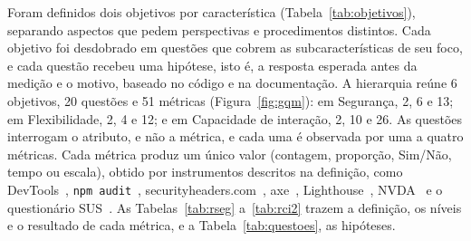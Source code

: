\documentclass[conference]{IEEEtran}
\begin{document}
Foram definidos dois objetivos por característica
(Tabela~\ref{tab:objetivos}), separando aspectos que pedem perspectivas e
procedimentos distintos. Cada objetivo foi desdobrado em questões que cobrem
as subcaracterísticas de seu foco, e cada questão recebeu uma hipótese, isto
é, a resposta esperada antes da medição e o motivo, baseado no código e na
documentação. A hierarquia reúne 6 objetivos, 20 questões e 51 métricas
(Figura~\ref{fig:gqm}): em Segurança, 2, 6 e 13; em Flexibilidade, 2, 4 e
12; e em Capacidade de interação, 2, 10 e 26. As questões interrogam o
atributo, e não a métrica, e cada uma é observada por uma a quatro métricas.
Cada métrica produz um único valor (contagem, proporção, Sim/Não, tempo ou
escala), obtido por instrumentos descritos na definição, como
DevTools~\cite{devtools}, \texttt{npm audit}~\cite{npmaudit},
securityheaders.com~\cite{secheaders}, axe~\cite{axe},
Lighthouse~\cite{lighthouse}, NVDA~\cite{nvda} e o questionário
SUS~\cite{brooke96}. As Tabelas~\ref{tab:rseg} a~\ref{tab:rci2} trazem a
definição, os níveis e o resultado de cada métrica, e a
Tabela~\ref{tab:questoes}, as hipóteses.
\end{document}
